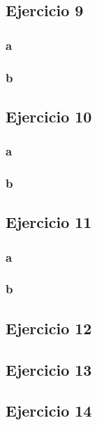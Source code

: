 \documentclass{article}
\begin{document}
\subsection*{Ejercicio 9}

\subsubsection*{a}

\subsubsection*{b}

\subsection*{Ejercicio 10}

\subsubsection*{a}

\subsubsection*{b}

\subsection*{Ejercicio 11}

\subsubsection*{a}

\subsubsection*{b}

\subsection*{Ejercicio 12}

\subsection*{Ejercicio 13}

\subsection*{Ejercicio 14}
\end{document}
